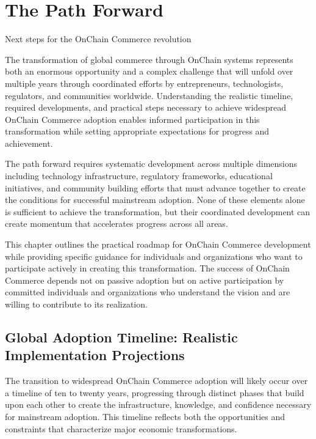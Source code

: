 \documentclass[
  Letterpaper,
]{scrbook}
\begin{document}
\chapter{The Path Forward}\label{sec-path-forward}

Next steps for the OnChain Commerce revolution

The transformation of global commerce through OnChain systems represents
both an enormous opportunity and a complex challenge that will unfold
over multiple years through coordinated efforts by entrepreneurs,
technologists, regulators, and communities worldwide. Understanding the
realistic timeline, required developments, and practical steps necessary
to achieve widespread OnChain Commerce adoption enables informed
participation in this transformation while setting appropriate
expectations for progress and achievement.

The path forward requires systematic development across multiple
dimensions including technology infrastructure, regulatory frameworks,
educational initiatives, and community building efforts that must
advance together to create the conditions for successful mainstream
adoption. None of these elements alone is sufficient to achieve the
transformation, but their coordinated development can create momentum
that accelerates progress across all areas.

This chapter outlines the practical roadmap for OnChain Commerce
development while providing specific guidance for individuals and
organizations who want to participate actively in creating this
transformation. The success of OnChain Commerce depends not on passive
adoption but on active participation by committed individuals and
organizations who understand the vision and are willing to contribute to
its realization.

\section{Global Adoption Timeline: Realistic Implementation
Projections}\label{global-adoption-timeline-realistic-implementation-projections}

The transition to widespread OnChain Commerce adoption will likely occur
over a timeline of ten to twenty years, progressing through distinct
phases that build upon each other to create the infrastructure,
knowledge, and confidence necessary for mainstream adoption. This
timeline reflects both the opportunities and constraints that
characterize major economic transformations.
\end{document}
